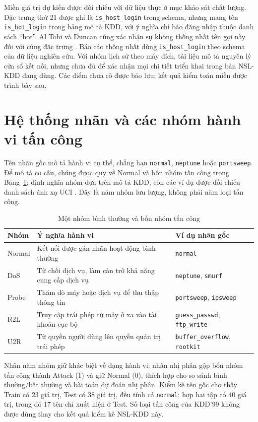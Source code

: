 Miền giá trị dự kiến được đối chiếu với dữ liệu thực ở mục khảo sát chất lượng. Đặc trưng thứ 21 được ghi là \texttt{is\_host\_login} trong schema, nhưng mang tên \texttt{is\_hot\_login} trong bảng mô tả KDD, với ý nghĩa chỉ báo đăng nhập thuộc danh sách ``hot''. Al Tobi và Duncan cũng xác nhận sự không thống nhất tên gọi này đối với cùng đặc trưng \cite{task2_kdd1999,chuong2_schema1999,task2_altobi2018}. Báo cáo thống nhất dùng \texttt{is\_host\_login} theo schema của dữ liệu nghiên cứu. Với nhóm lịch sử theo máy đích, tài liệu mô tả nguyên lý cửa sổ kết nối, nhưng chưa đủ để xác nhận mọi chi tiết triển khai trong bản NSL-KDD đang dùng. Các điểm chưa rõ được bảo lưu; kết quả kiểm toán miền được trình bày sau.

\section{Hệ thống nhãn và các nhóm hành vi tấn công}
Tên nhãn gốc mô tả hành vi cụ thể, chẳng hạn \texttt{normal}, \texttt{neptune} hoặc \texttt{portsweep}. Để mô tả cơ cấu, chúng được quy về Normal và bốn nhóm tấn công trong Bảng~\ref{tab:chuong2:taxonomy}; định nghĩa nhóm dựa trên mô tả KDD, còn các ví dụ được đối chiếu danh sách ánh xạ UCI \cite{task2_kdd1999,task2_uci1999}. Đây là năm nhóm lưu lượng, không phải năm loại tấn công.
\begin{table}[H]\centering
\caption{Một nhóm bình thường và bốn nhóm tấn công}
\label{tab:chuong2:taxonomy}
\small\setlength{\tabcolsep}{4pt}
\begin{tabular}{l>{\raggedright\arraybackslash}p{7.3cm}>{\raggedright\arraybackslash}p{5.5cm}}\toprule
Nhóm & Ý nghĩa hành vi & Ví dụ nhãn gốc\\\midrule
Normal & Kết nối được gán nhãn hoạt động bình thường & \texttt{normal}\\
DoS & Từ chối dịch vụ, làm cản trở khả năng cung cấp dịch vụ & \texttt{neptune}, \texttt{smurf}\\
Probe & Thăm dò máy hoặc dịch vụ để thu thập thông tin & \texttt{portsweep}, \texttt{ipsweep}\\
R2L & Truy cập trái phép từ máy ở xa vào tài khoản cục bộ & \texttt{guess\_passwd}, \texttt{ftp\_write}\\
U2R & Từ quyền người dùng lên quyền quản trị trái phép & \texttt{buffer\_overflow}, \texttt{rootkit}\\
\bottomrule\end{tabular}\end{table}
Nhãn năm nhóm giữ khác biệt về dạng hành vi; nhãn nhị phân gộp bốn nhóm tấn công thành Attack (1) và giữ Normal (0), thích hợp cho so sánh bình thường/bất thường và bài toán dự đoán nhị phân. Kiểm kê tên gốc cho thấy Train có 23 giá trị, Test có 38 giá trị, đều tính cả \texttt{normal}; hợp hai tập có 40 giá trị, trong đó 17 tên chỉ xuất hiện ở Test. Số loại tấn công của KDD'99 không được dùng thay cho kết quả kiểm kê NSL-KDD này.

